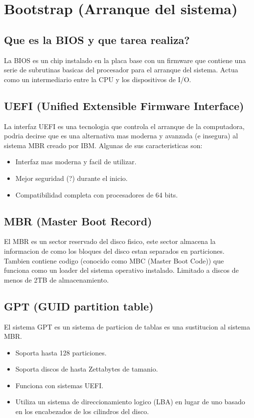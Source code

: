 \documentclass[11pt]{article}
\begin{document}
\section{Bootstrap (Arranque del sistema)}
\subsection{Que es la BIOS y que tarea realiza?}
La BIOS es un chip instalado en la placa base con un firmware que contiene una serie de subrutinas basicas del procesador para el arranque del sistema. Actua como un intermediario entre la CPU y los dispositivos de I/O.

\subsection{UEFI (Unified Extensible Firmware Interface)}
La interfaz UEFI es una tecnologia que controla el arranque de la computadora, podria decirse que es una alternativa mas moderna y avanzada (e insegura) al sistema MBR creado por IBM. Algunas de sus caracteristicas son:
\begin{itemize}
    \item Interfaz mas moderna y facil de utilizar.
    \item Mejor seguridad (?) durante el inicio.
    \item Compatibilidad completa con procesadores de 64 bits.
\end{itemize}

\subsection{MBR (Master Boot Record)}
El MBR es un sector reservado del disco fisico, este sector almacena la informacion de como los bloques del disco estan separados en particiones. Tambien contiene codigo (conocido como MBC (Master Boot Code)) que funciona como un loader del sistema operativo instalado.
Limitado a discos de menos de 2TB de almacenamiento.

\subsection{GPT (GUID partition table)}
El sistema GPT es un sistema de particion de tablas es una sustitucion al sistema MBR.
\begin{itemize}
    \item Soporta hasta 128 particiones.
    \item Soporta discos de hasta Zettabytes de tamanio.
    \item Funciona con sistemas UEFI.
    \item Utiliza un sistema de direccionamiento logico (LBA) en lugar de uno basado en los encabezados de los cilindros del disco.
\end{itemize}
\end{document}
